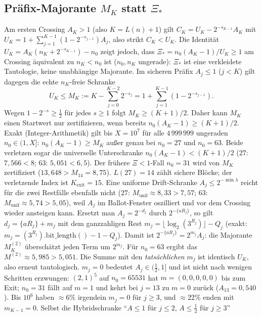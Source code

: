 \documentclass[11pt,reqno]{amsart}
\theoremstyle{definition}
\theoremstyle{remark}
\numberwithin{equation}{section}
\begin{document}
\subsection{Präfix-Majorante $M_K$ statt $\Xi_*$}

Am ersten Crossing $A_K>1$ (also $K=L(n)+1$) gilt
$C_K=U_K-2^{-s_{K-1}}A_K$ mit
$U_K=1+\sum_{j=1}^{K-1}(1-2^{-s_{j-1}})A_j$,
also strikt $C_K<U_K$.
Die Identität $U_K=A_K(n_K+2^{-s_{K-1}})-n_0$ zeigt jedoch, dass
$\Xi_*=n_0(A_K-1)/U_K\ge 1$ am Crossing äquivalent zu $n_K<n_0$ ist
($n_0,n_K$ ungerade): $\Xi_*$ ist eine verkleidete Tautologie, keine unabhängige Majorante.
Im sicheren Präfix $A_j\le 1$ ($j<K$) gilt dagegen die echte $n_K$-freie Schranke
\begin{equation}
U_K\le M_K:=K-\sum_{j=0}^{K-2}2^{-s_j}=1+\sum_{j=1}^{K-1}(1-2^{-s_{j-1}}).
\end{equation}
Wegen $1-2^{-s}\ge\tfrac12$ für jedes $s\ge 1$ folgt $M_K\ge(K+1)/2$.
Daher kann $M_K$ einen Startwert nur zertifizieren, wenn bereits
$n_0(A_K-1)\ge(K+1)/2$.
Exakt (Integer-Arithmetik) gilt bis $X=10^7$ für alle $4\,999\,999$ ungeraden $n_0\in(1,X]$:
$n_0(A_K-1)\ge M_K$ außer genau bei $n_0=27$ und $n_0=63$.
Beide verletzen sogar die universelle Unterschranke $n_0(A_K-1)<(K+1)/2$
($27$: $7{,}566<8$; $63$: $5{,}051<6{,}5$).
Der frühere $\Xi<1$-Fall $n_0=31$ wird von $M_K$ zertifiziert
($13{,}648>M_{14}=8{,}75$).
$L(27)=14$ zählt sichere Blöcke; der verletzende Index ist $K_{\mathrm{exit}}=15$.
Eine uniforme Drift-Schranke $A_j\le 2^{-\min\lambda}$ reicht für die zwei Restfälle
ebenfalls nicht ($27$: $M_{\mathrm{unif}}\approx 8{,}33>7{,}57$;
$63$: $M_{\mathrm{unif}}\approx 5{,}74>5{,}05$),
weil $A_j$ im Ballot-Fenster oszilliert und vor dem Crossing wieder ansteigen kann.
Ersetzt man $A_j=2^{-d_j}$ durch $2^{-\{aR_j\}}$, so gilt
$d_j=\{aR_j\}+m_j$ mit dem ganzzahligen Rest
$m_j=\lfloor\log_2(3^{R_j})\rfloor-Q_j$
(exakt: $m_j=(3^{R_j}).\mathrm{bit\_length}()-1-Q_j$).
Damit ist $2^{-\{aR_j\}}=2^{m_j}A_j$: die Majorante $M_K^{(2)}$ überschätzt
jeden Term um $2^{m_j}$. Für $n_0=63$ ergibt das $M^{(2)}\approx 5{,}985>5{,}051$.
Die Summe mit den \emph{tatsächlichen} $m_j$ ist identisch $U_K$, also erneut tautologisch.
$m_j=0$ bedeutet $A_j\in(\tfrac12,1]$ und ist nicht nach wenigen Schritten erzwungen:
$(2,1)^5$ auf $n_0=65531$ hat $m=(0,0,0,0,0)$ bis zum Exit;
$n_0=31$ fällt auf $m=1$ und kehrt bei $j=13$ zu $m=0$ zurück ($A_{13}=0{,}540$).
Bis $10^6$ haben $\approx 6\%$ irgendein $m_j=0$ für $j\ge 3$, und $\approx 22\%$ enden
mit $m_{K-1}=0$. Selbst die Hybridschranke ``$A\le 1$ für $j\le 2$, $A\le\tfrac12$ für $j\ge 3$''
\end{document}
